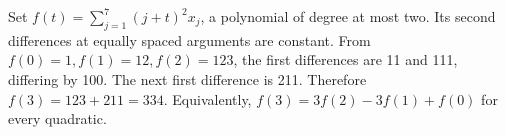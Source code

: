 Set $f(t)=\sum_{j=1}^7(j+t)^2x_j$, a polynomial of degree at most two. Its second differences at equally spaced arguments are constant. From $f(0)=1,f(1)=12,f(2)=123$, the first differences are 11 and 111, differing by 100. The next first difference is 211. Therefore $f(3)=123+211=\boxed{334}$. Equivalently, $f(3)=3f(2)-3f(1)+f(0)$ for every quadratic.
